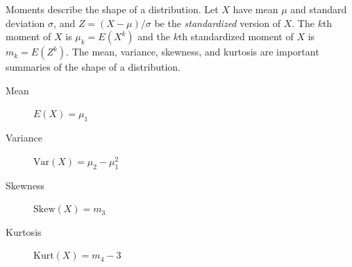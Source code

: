 \documentclass[10pt,landscape]{article}
\makeatletter
\newcommand{\var}{\textrm{Var}}
\renewcommand{\subsection}{\@startsection{subsection}{2}{0mm}%
                                {-1explus -.5ex minus -.2ex}%
                                {0.5ex plus .2ex}%
                                {\normalfont\normalsize\bfseries}}
\makeatother
\begin{document}
\begin{multicols*}{3}
Moments describe the shape of a distribution. Let $X$ have mean $\mu$ and standard deviation $\sigma$, and $Z=(X-\mu)/\sigma$ be the \emph{standardized} version of $X$. The $k$th moment of $X$ is $\mu_k = E(X^k)$ and the $k$th standardized moment of $X$ is $ m_k = E (Z^k)$.
The mean, variance,  skewness, and kurtosis are important summaries of the shape of a distribution.
    \begin{description}
        \item[Mean] $E(X) = \mu_1 $
        \item[Variance] $\var(X) = \mu_2 - \mu_1^2$
        \item[Skewness] $\textrm{Skew}(X) = m_3$
      \item[Kurtosis] $\textrm{Kurt}(X) = m_4 - 3$
    \end{description}


%

%


\end{multicols*}
\end{document}
